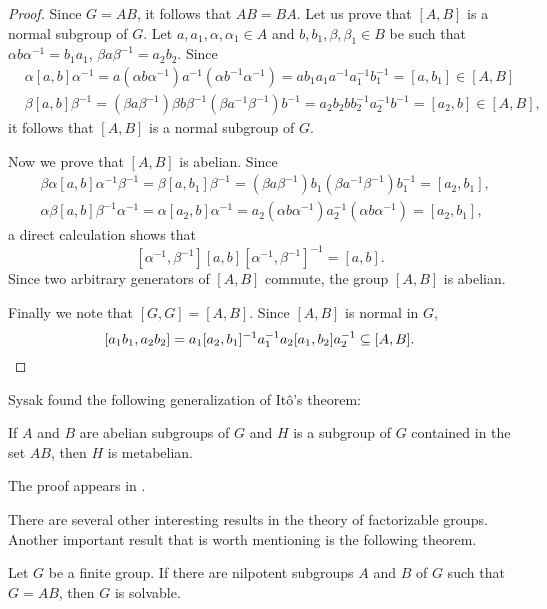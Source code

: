 \begin{proof}
	Since $G=AB$, it follows that $AB=BA$. Let us prove that $[A,B]$ is a normal 
	subgroup of $G$. Let $a,a_1,\alpha,\alpha_1\in A$ and $b,b_1,\beta,\beta_1\in B$ 
	be such that $\alpha b\alpha^{-1}=b_1a_1$, $\beta
	a\beta^{-1}=a_2b_2$. Since 
	\begin{align*}
		&\alpha[a,b]\alpha^{-1}=a(\alpha b\alpha^{-1})a^{-1}(\alpha b^{-1}\alpha^{-1})=ab_1a_1a^{-1}a_1^{-1}b_1^{-1}=[a,b_1]\in [A,B]\\
		&\beta[a,b]\beta^{-1}=(\beta a\beta^{-1})\beta b\beta^{-1}(\beta a^{-1}\beta^{-1})b^{-1}=a_2b_2bb_2^{-1}a_2^{-1}b^{-1}=[a_2,b]\in [A,B],
	\end{align*}
	it follows that $[A,B]$ is a normal subgroup of $G$. 

	Now we prove that $[A,B]$ is abelian. Since  
	\begin{align*}
		&\beta\alpha[a,b]\alpha^{-1}\beta^{-1} = \beta[a,b_1]\beta^{-1}=(\beta a\beta^{-1})b_1(\beta a^{-1}\beta^{-1})b_1^{-1}=[a_2,b_1],\\
		&\alpha\beta[a,b]\beta^{-1}\alpha^{-1} = \alpha[a_2,b]\alpha^{-1}=a_2(\alpha b\alpha^{-1})a_2^{-1}(\alpha b\alpha^{-1})=[a_2,b_1],
	\end{align*}
	a direct calculation shows that  
	\[
		[\alpha^{-1},\beta^{-1}][a,b][\alpha^{-1},\beta^{-1}]^{-1}=[a,b].
	\]
	Since two arbitrary generators of $[A,B]$ commute, the group $[A,B]$ is abelian.
	
	Finally we note that $[G,G]=[A,B]$. Since $[A,B]$ is normal in $G$,  
	\[
	[a_1b_1,a_2b_2]=a_1[a_2,b_1]^{-1}a_1^{-1}a_2[a_1,b_2]a_2^{-1}\subseteq [A,B].\qedhere 
	\]
\end{proof}


Sysak found the following generalization of It\^o's theorem:

\begin{theorem}[Sysak]
If $A$ and $B$ are abelian subgroups of $G$ and
$H$ is a subgroup of $G$ contained in the set $AB$, then
$H$ is metabelian. 
\end{theorem}

The proof appears in \cite{MR988177}.  

There are several other interesting results in the theory of factorizable groups. 
Another important result that is worth mentioning is the following
theorem. 

\begin{theorem}
Let $G$ be a finite group. If there are nilpotent subgroups $A$ and $B$ of $G$ such that 
$G=AB$, then $G$ is solvable. 
\end{theorem}

